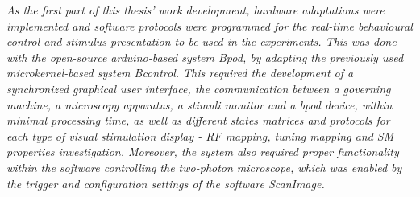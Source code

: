 
\label{cap:TechnicalImplementations}

\textit{As the first part of this thesis' work development, hardware adaptations were implemented and software protocols were programmed for the real-time behavioural control and stimulus presentation to be used in the experiments. This was done with the open-source arduino-based system Bpod, by adapting the previously used microkernel-based system Bcontrol. This required the development of a synchronized graphical user interface, the communication between a governing machine, a microscopy apparatus, a stimuli monitor and a bpod device, within minimal processing time, as well as different states matrices and protocols for each type of visual stimulation display - RF mapping, tuning mapping and SM properties investigation.
Moreover, the system also required proper functionality within the software controlling the two-photon microscope, which was enabled by the trigger and configuration settings of the software ScanImage.}




%
%
%
\cleardoublepage
